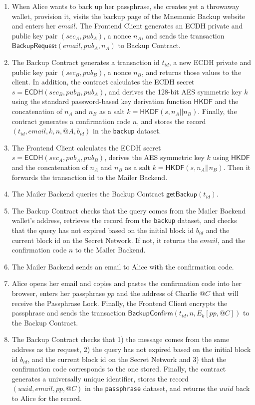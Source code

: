 \documentclass[runningheads]{llncs}
\newcommand{\ms}[1]{\ensuremath{\mathsf{#1}}}
\begin{document}
\begin{enumerate} 
\item When Alice wants to back up her passphrase, she creates yet a throwaway wallet, provision it, visits the backup page of the Mnemonic Backup website and enters her $email$. The Frontend Client generates an ECDH private and public key pair $(sec_A, pub_A)$, a nonce $n_A$, and sends the transaction $\ms{BackupRequest}(email, pub_A, n_A)$ to Backup Contract.
\item The Backup Contract generates a transaction id $t_{id}$, a new ECDH private and public key pair $(sec_B, pub_B)$, a nonce $n_B$, and returns those values to the client. In addition, the contract calculates the ECDH secret $s=\ms{ECDH}(sec_B, pub_B, pub_A)$, and derives the 128-bit AES symmetric key $k$ using the standard password-based key derivation function $\ms{HKDF}$ and the concatenation of $n_A$ and $n_B$ as a salt $k=\ms{HKDF}(s, n_A || n_B)$. Finally, the contract generates a confirmation code $n$, and stores the record $(t_{id}, email, k, n, @A, b_{id})$ in the {\tt backup} dataset. 
\item The Frontend Client calculates the ECDH secret $s=\ms{ECDH}(sec_A, pub_A, pub_B)$, derives the AES symmetric key $k$ using $\ms{HKDF}$ and the concatenation of $n_A$ and $n_B$ as a salt $k=\ms{HKDF}(s, n_A || n_B)$. Then it forwards the transaction id to the Mailer Backend. 
\item The Mailer Backend queries the Backup Contract $\ms{getBackup}(t_{id})$. 
\item The Backup Contract checks that the query comes from the Mailer Backend wallet's address, retrieves the record from the {\tt backup} dataset, and checks that the query has not expired based on the initial block id $b_{id}$ and the current block id on the Secret Network. If not, it returns the $email$, and the confirmation code $n$ to the Mailer Backend. 
\item The Mailer Backend sends an email to Alice with the confirmation code. 
\item Alice opens her email and copies and pastes the confirmation code into her browser, enters her passphrase $pp$ and the address of Charlie $@C$ that will receive the Passphrase Lock. Finally, the Frontend Client encrypts the passphrase and sends the transaction $\ms{BackupConfirm}(t_{id}, n, E_{k}[pp, @C])$ to the Backup Contract.
\item The Backup Contract checks that 1) the message comes from the same address as the request, 2) the query has not expired based on the initial block id $b_{id}$, and the current block id on the Secret Network and 3) that the confirmation code corresponds to the one stored. Finally, the contract generates a universally unique identifier, stores the record $(uuid, email, pp, @C)$ in the {\tt passphrase} dataset, and returns the $uuid$ back to Alice for the record. 
\end{enumerate}
\end{document}
